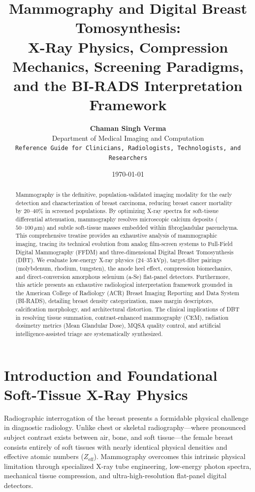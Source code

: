 \documentclass[11pt,a4paper]{article}
\title{\textbf{\huge Mammography and Digital Breast Tomosynthesis:}\\[0.3em]
\Large X-Ray Physics, Compression Mechanics, Screening Paradigms,\\
and the BI-RADS Interpretation Framework}
\author{\textbf{Chaman Singh Verma}\\[0.2em]
\small Department of Medical Imaging and Computation\\
\small \texttt{Reference Guide for Clinicians, Radiologists, Technologists, and Researchers}}
\date{\today}
\begin{document}
\maketitle

\begin{abstract}
Mammography is the definitive, population-validated imaging modality for the early detection and characterization of breast carcinoma, reducing breast cancer mortality by $20\text{--}40\%$ in screened populations. By optimizing X-ray spectra for soft-tissue differential attenuation, mammography resolves microscopic calcium deposits ($50\text{--}100\,\mu\text{m}$) and subtle soft-tissue masses embedded within fibroglandular parenchyma. This comprehensive treatise provides an exhaustive analysis of mammographic imaging, tracing its technical evolution from analog film-screen systems to Full-Field Digital Mammography (FFDM) and three-dimensional Digital Breast Tomosynthesis (DBT). We evaluate low-energy X-ray physics ($24\text{--}35\,\text{kVp}$), target-filter pairings (molybdenum, rhodium, tungsten), the anode heel effect, compression biomechanics, and direct-conversion amorphous selenium (a-Se) flat-panel detectors. Furthermore, this article presents an exhaustive radiological interpretation framework grounded in the American College of Radiology (ACR) Breast Imaging Reporting and Data System (BI-RADS), detailing breast density categorization, mass margin descriptors, calcification morphology, and architectural distortion. The clinical implications of DBT in resolving tissue summation, contrast-enhanced mammography (CEM), radiation dosimetry metrics (Mean Glandular Dose), MQSA quality control, and artificial intelligence-assisted triage are systematically synthesized.
\end{abstract}

\tableofcontents
\newpage

\section{Introduction and Foundational Soft-Tissue X-Ray Physics}

Radiographic interrogation of the breast presents a formidable physical challenge in diagnostic radiology. Unlike chest or skeletal radiography—where pronounced subject contrast exists between air, bone, and soft tissue—the female breast consists entirely of soft tissues with nearly identical physical densities and effective atomic numbers ($Z_{\text{eff}}$). Mammography overcomes this intrinsic physical limitation through specialized X-ray tube engineering, low-energy photon spectra, mechanical tissue compression, and ultra-high-resolution flat-panel digital detectors.
\end{document}
